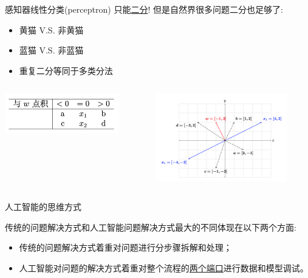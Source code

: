 \documentclass[handout]{beamer}
\begin{document}
\begin{frame}{感知器线性分类(perceptron)}
只能\underline{二分}! 但是自然界很多问题二分也足够了:
\begin{itemize}
	\item 黄猫 V.S. 非黄猫
	\item 蓝猫 V.S. 非蓝猫
	\item 重复二分等同于多类分法
\end{itemize}
\begin{columns}
\begin{column}{0.3\textwidth}
\centering
\includegraphics[width=\textwidth]{fig/P2dotpTable}
\end{column}
\begin{column}{0.7\textwidth}
	\begin{figure}[H]
	\centering
	\includegraphics[width=\textwidth]{fig/C2C2dotprodt}
\end{figure}	
\end{column}
\end{columns}
\end{frame}





\begin{frame}{人工智能的思维方式}

传统的问题解决方式和人工智能问题解决方式最大的不同体现在以下两个方面:
	\begin{itemize}
	\setlength\itemsep{1em}
		\item 传统的问题解决方式着重对问题进行分步骤拆解和处理；
		\item 人工智能对问题的解决方式着重对整个流程的\underline{两个端口}进行数据和模型调试。
	\end{itemize}	
\end{frame}
\end{document}
